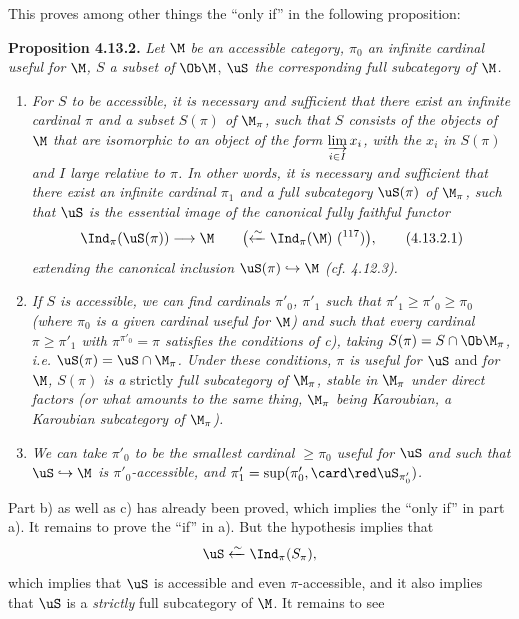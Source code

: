 This proves among other things the ``only if'' in the following proposition:

\textbf{Proposition 4.13.2.} \textit{Let $\M$ be an accessible category, $\pi_0$ an infinite cardinal useful for $\M$, $S$ a subset of} $\Ob\M$, \textit{$\uS$ the corresponding full subcategory of $\M$.}

\begin{enumerate}
\item[\textit{a)}] \textit{For $S$ to be accessible, it is necessary and sufficient that there exist an infinite cardinal $\pi$ and a subset $S(\pi)$ of $\M_\pi$, such that $S$ consists of the objects of $\M$ that are isomorphic to an object of the form $\varinjlim\limits_{i\in I} x_i$, with the $x_i$ in $S(\pi)$ and $I$ large relative to $\pi$. In other words, it is necessary and sufficient that there exist an infinite cardinal $\pi_1$ and a full subcategory %
$\uS(\pi)$ of $\M_\pi$, such that $\uS$ is the essential image of the canonical fully faithful functor}
\[
\Ind_\pi(\uS(\pi)) \longrightarrow \M \qquad \bigl(\xleftarrow{\sim} \Ind_\pi(\M)\ \text{(\footnotemark[117])}\bigr) , \tag*{(4.13.2.1)} %
\]
\textit{extending the canonical inclusion $\uS(\pi) \hookrightarrow \M$ (cf. 4.12.3).}
\item[\textit{b)}] 
\textit{If $S$ is accessible, we can find cardinals $\pi'_0$, $\pi'_1$ such that $\pi'_1 \geqslant \pi'_0 \geqslant \pi_0$ (where $\pi_0$ is a given cardinal useful for $\M$)}
\textit{and such that every cardinal $\pi \geqslant \pi'_1$ with $\pi^{\pi'_0} = \pi$ satisfies the conditions of c), taking $S(\pi) = S \cap \Ob\M_\pi$, i.e. $\uS(\pi) = \uS \cap \M_\pi$. Under these conditions, $\pi$ is useful for $\uS$} and \textit{for $\M$, $S(\pi)$ is a} strictly \textit{full subcategory of $\M_\pi$, stable in $\M_\pi$ under direct factors (or what amounts to the same thing, $\M_\pi$ being Karoubian, a Karoubian subcategory of $\M_\pi$).}
\item[\textit{c)}] \textit{We can take $\pi'_0$ to be the smallest cardinal $\geqslant \pi_0$ useful for $\uS$ and such that $\uS \hookrightarrow \M$ is $\pi'_0$-accessible, and $\pi'_1 = \sup(\pi'_0, \card\red\uS_{\pi'_0})$.}
\end{enumerate}

Part b) as well as c) has already been proved, which implies the ``only if'' in part a). It remains to prove the ``if'' in a). But the hypothesis implies that
\[
\uS \xleftarrow{\sim} \Ind_\pi(S_\pi) ,
\]
which implies that $\uS$ is accessible and even $\pi$-accessible, and it also implies that $\uS$ is a \textit{strictly} full subcategory of $\M$. It remains to see

